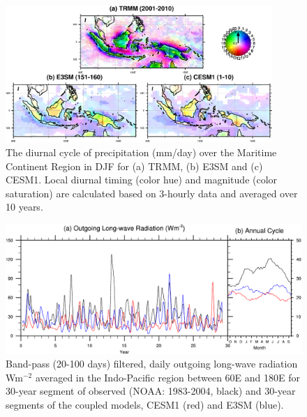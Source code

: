 \documentclass[draft,ms]{AGUTeX}
\begin{document}
\begin{article}
\begin{figure}[fp]
  \begin{center}
    \noindent\includegraphics[width=0.9\textwidth,angle=0.]{./figs/f_dcycle_indo.pdf}
  \end{center}
  \caption{The diurnal cycle of precipitation (mm/day) over the Maritime Continent Region in DJF for (a) TRMM, (b) E3SM and (c) CESM1. Local diurnal timing (color hue) and magnitude (color saturation) are calculated based on 3-hourly data and averaged over 10 years.}
\label{f_dcycle_indo}
\end{figure}

\begin{figure}[t]
  \begin{center}
    \noindent \includegraphics[width=1.1\textwidth,angle=0.] {./figs/f_bpass.pdf}
  \end{center}
  \caption{Band-pass (20-100 days) filtered, daily outgoing long-wave radiation Wm$^{-2}$ averaged in the Indo-Pacific region between 60\deg E and 180\deg E for 30-year segment of observed (NOAA: 1983-2004, black) and 30-year segments of the coupled models, CESM1 (red) and E3SM (blue).}
\label{f_bpass}
\end{figure}


\end{article}
\end{document}
